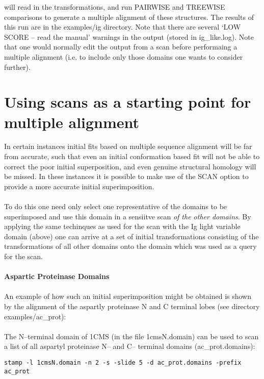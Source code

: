 will read in the transformations, and run PAIRWISE and TREEWISE 
comparisons to generate a multiple alignment of these structures.  The results
of this run are in the examples/ig directory.  Note that there are
several `LOW SCORE -- read the manual' warnings in the output (stored in 
ig\_like.log).  Note that one would normally edit the output from a scan
before performaing a multiple alignment (i.e. to include only those domains
one wants to consider further).



\section{Using scans as a starting point for multiple alignment}

In certain instances initial fits based on multiple sequence
alignment will be far from accurate, such that even an initial
conformation based fit will not be able to correct the poor
initial superposition, and even genuine structural homology will
be missed.  In these instances it is possible to make use of the
SCAN option to provide a more accurate initial superimposition.\\
\\
To do this one need only select one representative of the
domains to be superimposed and use this domain in a sensiitve
scan {\em of the other domains}.  By applying the same techinques as
used for the scan with the Ig  light variable domain (above) one
can arrive at a set of initial transformations consisting of the
transformations of all other domains onto the domain which was
used as a query for the scan.\\
\\
{\bf Aspartic Proteinase Domains}\\
\\
An example of how such an initial superimposition might be
obtained is shown by the alignment of the aspartly proteinase N
and C terminal lobes (see directory examples/ac\_prot):\\
\\
The N--terminal domain of 1CMS (in the file 1cmsN.domain) can be
used to scan a list of all aspartyl proteinase
N-- and C-- terminal domains (ac\_prot.domains):

\begin{scriptsize}\begin{verbatim}
stamp -l 1cmsN.domain -n 2 -s -slide 5 -d ac_prot.domains -prefix ac_prot
\end{verbatim} \end{scriptsize}

